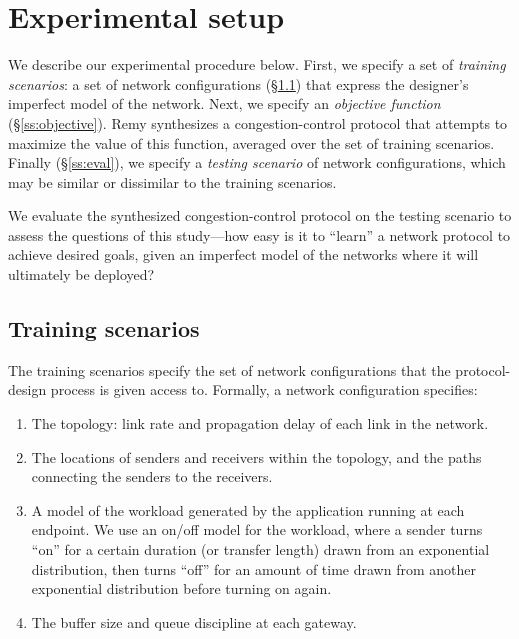 \section{Experimental setup}

\label{s:experiment}
We describe our experimental procedure below.  First, we specify a set
of \textit{training scenarios}: a set of network configurations
(\S\ref{ss:nwkcfg}) that express the designer's imperfect model of the
network. Next, we specify an \textit{objective function}
(\S\ref{ss:objective}). Remy synthesizes a congestion-control protocol
that attempts to maximize the value of this function, averaged over
the set of training scenarios. Finally (\S\ref{ss:eval}), we specify a
\textit{testing scenario} of network configurations, which may be
similar or dissimilar to the training scenarios.

We evaluate the synthesized congestion-control protocol on the testing
scenario to assess the questions of this study---how easy is it to
``learn'' a network protocol to achieve desired goals, given an imperfect
model of the networks where it will ultimately be deployed?


\subsection{Training scenarios}
\label{ss:nwkcfg}
The training scenarios specify the set of network configurations that
the protocol-design process is given access to. Formally, a network
configuration specifies:

\begin{enumerate}
\item The topology: link rate and propagation delay of each link in the network.
\item The locations of senders and receivers within the topology, and the paths
      connecting the senders to the receivers.
\item A model of the workload generated by the application running
  at each endpoint. We use an on/off model for the workload, where a
  sender turns ``on'' for a certain duration (or transfer length) drawn
  from an exponential distribution, then turns ``off'' for an amount of
  time drawn from another exponential distribution before turning on
  again.
\item The buffer size and queue discipline at each gateway.
\end{enumerate}

